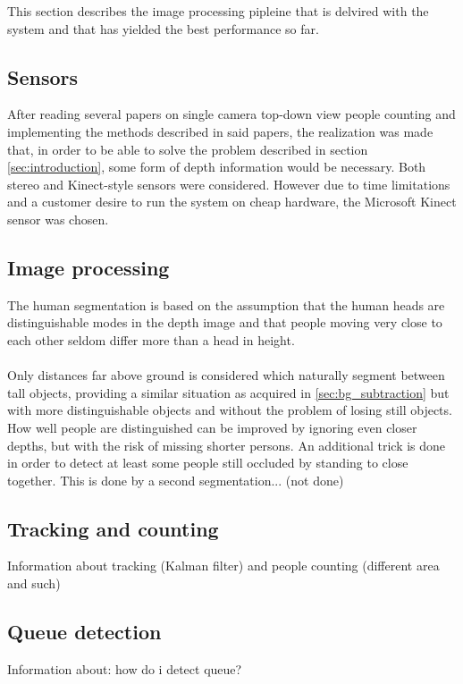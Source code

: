 This section describes the image processing pipleine that is delvired with the system and that has yielded the best performance so far.

\subsection{Sensors}
After reading several papers on single camera top-down view people counting and implementing the methods described in said papers, the realization was made that, in order to be able to solve the problem described in section \ref{sec:introduction}, some form of depth information would be necessary. Both stereo and Kinect-style sensors were considered. However due to time limitations and a customer desire to run the system on cheap hardware, the Microsoft Kinect sensor was chosen.

\subsection{Image processing}
The human segmentation is based on the assumption that the human heads are distinguishable modes in the depth image and that people moving very close to each other seldom differ more than a head in height.\\
\\
Only distances far above ground is considered which naturally segment between tall objects, providing a similar situation as acquired in \ref{sec:bg_subtraction} but with more distinguishable objects and without the problem of losing still objects. How well people are distinguished can be improved by ignoring even closer depths, but with the risk of missing shorter persons. An additional trick is done in order to detect at least some people still occluded by standing to close together. This is done by a second segmentation... (not done)

\subsection{Tracking and counting}
Information about tracking (Kalman filter) and people counting (different area and such)

\subsection{Queue detection}
Information about: how do i detect queue?

